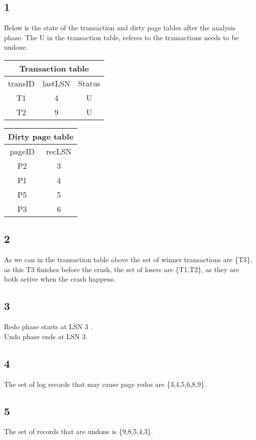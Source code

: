 \documentclass{article}
\theoremstyle{plain}
\theoremstyle{nonumberplain}
\begin{document}
\subsection*{1}

Below is the state of the transaction and dirty page tables after the analysis phase.
The U in the transaction table, referes to the transactions needs to be undone.\\
\begin{tabular}{| c | c | c |}
	\hline
	\multicolumn{3}{|c|}{Transaction table} \\
	\hline
	transID & lastLSN & Status\\
	\hline
	T1 & 4 & U\\
	\hline
	T2 & 9 & U\\
	\hline
\end{tabular}
\begin{tabular}{| c | c |}
	\hline
	\multicolumn{2}{|c|}{Dirty page table} \\
	\hline
	pageID & recLSN \\
	\hline
	P2 & 3 \\
	\hline
	P1 & 4 \\
	\hline
	P5 & 5 \\
	\hline
	P3 & 6 \\
	\hline
\end{tabular}

\subsection*{2}

As we can in the transaction table above the set of winner transactions are \{T3\}, as this T3 finishes before the crash, the set of losers are \{T1,T2\}, as they are both active when the crash happens.

\subsection*{3}
Redo phase starts at LSN 3 .\\
Undo phase ends at LSN 3.

\subsection*{4}
The set of log records that may cause page redos are \{3,4,5,6,8,9\}.

\subsection*{5}
The set of records that are undone is \{9,8,5,4,3\}.
\end{document}
